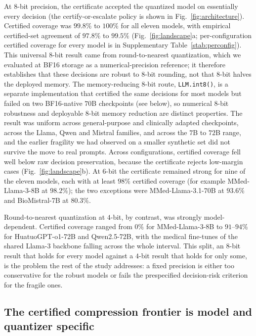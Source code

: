 \documentclass[pdflatex,sn-mathphys-num]{sn-jnl}%
\theoremstyle{thmstyleone}%
\theoremstyle{thmstyletwo}%
\theoremstyle{thmstylethree}%
\begin{document}
At $8$-bit precision, the certificate accepted the quantized model on essentially every decision (the certify-or-escalate policy is shown in Fig.~\ref{fig:architecture}). Certified
coverage was $99.8\%$ to $100\%$ for all eleven models, with empirical certified-set agreement of
$97.8\%$ to $99.5\%$ (Fig.~\ref{fig:landscape}a; per-configuration
certified coverage for every model is in Supplementary Table~\ref{stab:perconfig}). This universal
$8$-bit result came from round-to-nearest quantization, which we evaluated at BF16 storage as a
numerical-precision reference; it therefore establishes that these decisions are robust to $8$-bit rounding,
not that $8$-bit halves the deployed memory. The memory-reducing $8$-bit route, \texttt{LLM.int8()}, is a separate
implementation that certified the same decisions for most models but failed on two BF16-native $70$B
checkpoints (see below), so numerical $8$-bit robustness and deployable $8$-bit memory reduction are distinct properties. The result was uniform
across general-purpose and clinically adapted checkpoints, across the Llama, Qwen and Mistral
families, and across the $7$B to $72$B range, and the earlier fragility we had observed on a
smaller synthetic set did not survive the move to real prompts. Across configurations, certified coverage fell well below raw decision preservation, because the certificate rejects low-margin cases (Fig.~\ref{fig:landscape}b). At $6$-bit the certificate remained
strong for nine of the eleven models, each with at least $98\%$ certified coverage (for example
MMed-Llama-3-8B at $98.2\%$); the two exceptions were MMed-Llama-3.1-70B at $93.6\%$ and
BioMistral-7B at $80.3\%$.
 
Round-to-nearest quantization at $4$-bit, by contrast, was strongly model-dependent. Certified coverage ranged
from $0\%$ for MMed-Llama-3-8B to $91$--$94\%$ for HuatuoGPT-o1-72B and Qwen2.5-72B, with the
medical fine-tunes of the shared Llama-3 backbone falling across the whole interval. This split, an
$8$-bit result that holds for every model against a $4$-bit result that holds for only some, is the
problem the rest of the study addresses: a fixed precision is either too conservative for the robust
models or fails the prespecified decision-risk criterion for the fragile ones.
 
\subsection*{The certified compression frontier is model and quantizer specific}
 
\end{document}
